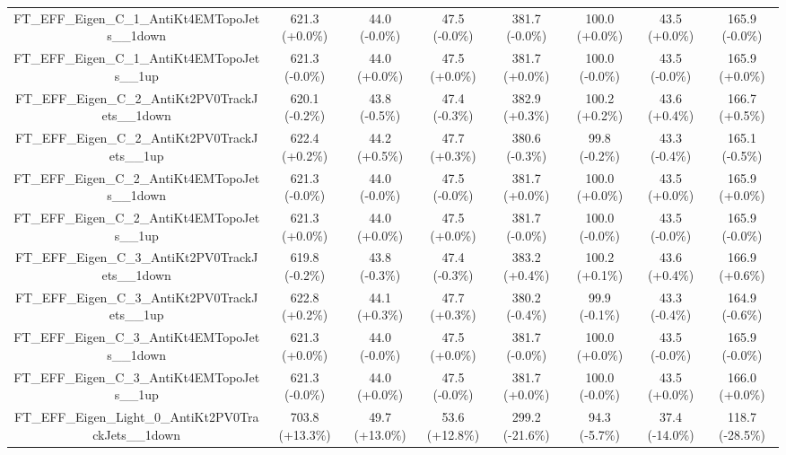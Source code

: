 \begin{table}[htbp!]
\begin{tiny}
\begin{center}
\begin{tabular}{c|c|c|c||c|c|c|c}
FT\_EFF\_Eigen\_C\_1\_AntiKt4EMTopoJets\_\_1down             & 621.3     (+0.0\%) & 44.0      (-0.0\%) & 47.5      (-0.0\%) & 381.7     (-0.0\%) & 100.0     (+0.0\%) & 43.5      (+0.0\%) & 165.9     (-0.0\%) \\ 
FT\_EFF\_Eigen\_C\_1\_AntiKt4EMTopoJets\_\_1up               & 621.3     (-0.0\%) & 44.0      (+0.0\%) & 47.5      (+0.0\%) & 381.7     (+0.0\%) & 100.0     (-0.0\%) & 43.5      (-0.0\%) & 165.9     (+0.0\%) \\ 
FT\_EFF\_Eigen\_C\_2\_AntiKt2PV0TrackJets\_\_1down           & 620.1     (-0.2\%) & 43.8      (-0.5\%) & 47.4      (-0.3\%) & 382.9     (+0.3\%) & 100.2     (+0.2\%) & 43.6      (+0.4\%) & 166.7     (+0.5\%) \\ 
FT\_EFF\_Eigen\_C\_2\_AntiKt2PV0TrackJets\_\_1up             & 622.4     (+0.2\%) & 44.2      (+0.5\%) & 47.7      (+0.3\%) & 380.6     (-0.3\%) & 99.8      (-0.2\%) & 43.3      (-0.4\%) & 165.1     (-0.5\%) \\ 
FT\_EFF\_Eigen\_C\_2\_AntiKt4EMTopoJets\_\_1down             & 621.3     (-0.0\%) & 44.0      (-0.0\%) & 47.5      (-0.0\%) & 381.7     (+0.0\%) & 100.0     (+0.0\%) & 43.5      (+0.0\%) & 165.9     (+0.0\%) \\ 
FT\_EFF\_Eigen\_C\_2\_AntiKt4EMTopoJets\_\_1up               & 621.3     (+0.0\%) & 44.0      (+0.0\%) & 47.5      (+0.0\%) & 381.7     (-0.0\%) & 100.0     (-0.0\%) & 43.5      (-0.0\%) & 165.9     (-0.0\%) \\ 
FT\_EFF\_Eigen\_C\_3\_AntiKt2PV0TrackJets\_\_1down           & 619.8     (-0.2\%) & 43.8      (-0.3\%) & 47.4      (-0.3\%) & 383.2     (+0.4\%) & 100.2     (+0.1\%) & 43.6      (+0.4\%) & 166.9     (+0.6\%) \\ 
FT\_EFF\_Eigen\_C\_3\_AntiKt2PV0TrackJets\_\_1up             & 622.8     (+0.2\%) & 44.1      (+0.3\%) & 47.7      (+0.3\%) & 380.2     (-0.4\%) & 99.9      (-0.1\%) & 43.3      (-0.4\%) & 164.9     (-0.6\%) \\ 
FT\_EFF\_Eigen\_C\_3\_AntiKt4EMTopoJets\_\_1down             & 621.3     (+0.0\%) & 44.0      (-0.0\%) & 47.5      (+0.0\%) & 381.7     (-0.0\%) & 100.0     (+0.0\%) & 43.5      (-0.0\%) & 165.9     (-0.0\%) \\ 
FT\_EFF\_Eigen\_C\_3\_AntiKt4EMTopoJets\_\_1up               & 621.3     (-0.0\%) & 44.0      (+0.0\%) & 47.5      (-0.0\%) & 381.7     (+0.0\%) & 100.0     (-0.0\%) & 43.5      (+0.0\%) & 166.0     (+0.0\%) \\ 
FT\_EFF\_Eigen\_Light\_0\_AntiKt2PV0TrackJets\_\_1down       & 703.8     (+13.3\%) & 49.7      (+13.0\%) & 53.6      (+12.8\%) & 299.2     (-21.6\%) & 94.3      (-5.7\%) & 37.4      (-14.0\%) & 118.7     (-28.5\%) \\ 

\end{tabular}
\end{center}
\end{tiny}
\end{table}

